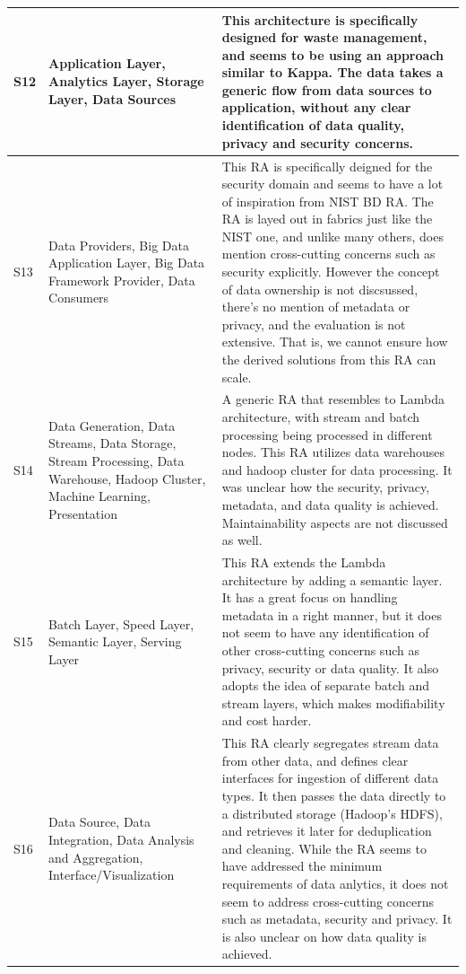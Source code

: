 \documentclass[review]{elsarticle}
\begin{document}
\begin{table}[h!]
\begin{tabular}{ |p{0.5cm}|p{3cm}|p{7.5cm}| }
        \hline
        S12 & Application Layer, Analytics Layer, Storage Layer, Data Sources & This architecture is specifically designed for waste management, and seems to be using an approach similar to Kappa. The data takes a generic flow from data sources to application, without any clear identification of data quality, privacy and security concerns.    \\
        \hline
        S13 & Data Providers, Big Data Application Layer, Big Data Framework Provider, Data Consumers & This RA is specifically deigned for the security domain and seems to have a lot of inspiration from NIST BD RA. The RA is layed out in fabrics just like the NIST one, and unlike many others, does mention cross-cutting concerns such as security explicitly. However the concept of data ownership is not discsussed, there's no mention of metadata or privacy, and the evaluation is not extensive. That is, we cannot ensure how the derived solutions from this RA can scale.    \\
        \hline
        S14 & Data Generation, Data Streams, Data Storage, Stream Processing, Data Warehouse, Hadoop Cluster, Machine Learning, Presentation & A generic RA that resembles to Lambda architecture, with stream and batch processing being processed in different nodes. This RA utilizes data warehouses and hadoop cluster for data processing. It was unclear how the security, privacy, metadata, and data quality is achieved. Maintainability aspects are not discussed as well. \\
        \hline
        S15 & Batch Layer, Speed Layer, Semantic Layer, Serving Layer & This RA extends the Lambda architecture by adding a semantic layer. It has a great focus on handling metadata in a right manner, but it does not seem to have any identification of other cross-cutting concerns such as privacy, security or data quality. It also adopts the idea of separate batch and stream layers, which makes modifiability and cost harder. \\
        \hline
        S16 & Data Source, Data Integration, Data Analysis and Aggregation, Interface/Visualization & This RA clearly segregates stream data from other data, and defines clear interfaces for ingestion of different data types. It then passes the data directly to a distributed storage (Hadoop's HDFS), and retrieves it later for deduplication and cleaning. While the RA seems to have addressed the minimum requirements of data anlytics, it does not seem to address cross-cutting concerns such as metadata, security and privacy. It is also unclear on how data quality is achieved. \\

\end{tabular}
\end{table}
\end{document}
